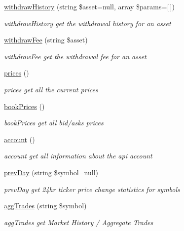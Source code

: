 \begin{DoxyCompactItemize}
\hyperlink{classBinance_1_1API_ac58d133afd56809f520aeb05e12b69d4}{withdraw\-History} (string \$asset=null, array \$params=\mbox{[}$\,$\mbox{]})
\begin{DoxyCompactList}\small\item\em withdraw\-History get the withdrawal history for an asset \end{DoxyCompactList}\item 
\hyperlink{classBinance_1_1API_a6b849844ef3f827d8144ae8e129978b5}{withdraw\-Fee} (string \$asset)
\begin{DoxyCompactList}\small\item\em withdraw\-Fee get the withdrawal fee for an asset \end{DoxyCompactList}\item 
\hyperlink{classBinance_1_1API_a718271dc0691ae3a1f60dc0e7ad89698}{prices} ()
\begin{DoxyCompactList}\small\item\em prices get all the current prices \end{DoxyCompactList}\item 
\hyperlink{classBinance_1_1API_aa1e851e6a5fe2e01f7c5493fa9b90c97}{book\-Prices} ()
\begin{DoxyCompactList}\small\item\em book\-Prices get all bid/asks prices \end{DoxyCompactList}\item 
\hyperlink{classBinance_1_1API_a14272f6a80009bc8fd742b5f35fee9a5}{account} ()
\begin{DoxyCompactList}\small\item\em account get all information about the api account \end{DoxyCompactList}\item 
\hyperlink{classBinance_1_1API_a884414d58f6297f79afe94a60dc0d794}{prev\-Day} (string \$symbol=null)
\begin{DoxyCompactList}\small\item\em prev\-Day get 24hr ticker price change statistics for symbols \end{DoxyCompactList}\item 
\hyperlink{classBinance_1_1API_af047ce7afeff0729b62fb28b2697ad9f}{agg\-Trades} (string \$symbol)
\begin{DoxyCompactList}\small\item\em agg\-Trades get Market History / Aggregate Trades \end{DoxyCompactList}\item 

\end{DoxyCompactItemize}
